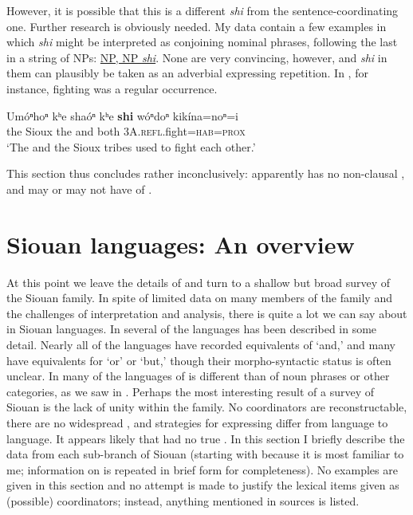 \documentclass[output=paper]{LSP/langsci}
\begin{document}
However, it is possible that this is a different \textit{shi} from the sentence-coordinating one. Further research is obviously needed. My data contain a few examples in which \textit{shi} might be interpreted as conjoining nominal phrases, following the last in a string of NPs:  \underline{NP, NP \textit{shi}}. None are very convincing, however, and \textit{shi} in them can plausibly be taken as an adverbial expressing repetition. In , for instance, fighting was a regular occurrence.

\begin{exe}
\ex\label{ex:rudin:35}
\gll Umóⁿhoⁿ kʰe shaóⁿ kʰe \textbf{shi}  wóⁿdoⁿ 	kikína=noⁿ=i \\
    	the 	Sioux  	the 	and both \textsc{3A}.\textsc{refl}.fight=\textsc{hab}=\textsc{prox} \\
\trans `The  and the Sioux tribes used to fight each other.'    
\end{exe}

This section thus concludes rather inconclusively:  apparently has no non-clausal , and may or may not have  of . 

\section{Siouan languages: An overview}\label{sec:rudin:4}

At this point we leave the details of  and turn to a shallow but broad survey of the Siouan family. In spite of limited data on many members of the family and the challenges of interpretation and analysis, there is quite a lot we can say about  in Siouan languages. In several of the languages  has been described in some detail. Nearly all of the languages have recorded equivalents of `and,' and many have equivalents for `or' or `but,' though their morpho-syntactic status is often unclear. In many of the languages  of  is different than  of noun phrases or other categories, as we saw in . Perhaps the most interesting result of a survey of Siouan  is the lack of unity within the family. No coordinators are reconstructable, there are no widespread , and strategies for expressing  differ from language to language. It appears likely that  had no true . In this section I briefly describe the data from each sub-branch of Siouan (starting with  because it is most familiar to me; information on  is repeated in brief form for completeness). No examples are given in this section and no attempt is made to justify the lexical items given as (possible) coordinators; instead, anything mentioned in sources is listed.
\end{document}
